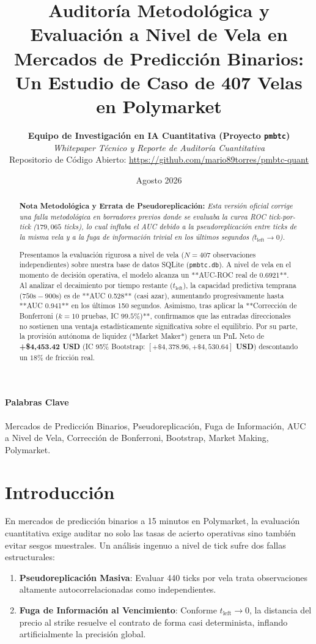 \documentclass[10pt,twocolumn]{article}
\title{\textbf{Auditoría Metodológica y Evaluación a Nivel de Vela en Mercados de Predicción Binarios: Un Estudio de Caso de 407 Velas en Polymarket}}
\author{\textbf{Equipo de Investigación en IA Cuantitativa (Proyecto \texttt{pmbtc})} \\
\textit{Whitepaper Técnico y Reporte de Auditoría Cuantitativa} \\
Repositorio de Código Abierto: \url{https://github.com/mario89torres/pmbtc-quant}}
\date{Agosto 2026}
\begin{document}
\maketitle

\begin{abstract}
\noindent \textbf{Nota Metodológica y Errata de Pseudoreplicación:} \textit{Esta versión oficial corrige una falla metodológica en borradores previos donde se evaluaba la curva ROC tick-por-tick ($179,065$ ticks), lo cual inflaba el AUC debido a la pseudoreplicación entre ticks de la misma vela y a la fuga de información trivial en los últimos segundos ($t_{\text{left}} \to 0$).}

Presentamos la evaluación rigurosa a nivel de vela ($N=407$ observaciones independientes) sobre nuestra base de datos SQLite (\texttt{pmbtc.db}). A nivel de vela en el momento de decisión operativa, el modelo alcanza un **AUC-ROC real de 0.6921**. Al analizar el decaimiento por tiempo restante ($t_{\text{left}}$), la capacidad predictiva temprana ($750\text{s}-900\text{s}$) es de **AUC 0.528** (casi azar), aumentando progresivamente hasta **AUC 0.941** en los últimos 150 segundos. Asimismo, tras aplicar la **Corrección de Bonferroni ($k=10$ pruebas, IC $99.5\%$)**, confirmamos que las entradas direccionales no sostienen una ventaja estadísticamente significativa sobre el equilibrio. Por su parte, la provisión autónoma de liquidez (*Market Maker*) genera un PnL Neto de \textbf{+\$4,453.42 USD} (IC 95\% Bootstrap: \textbf{$[+\$4,378.96, +\$4,530.64]$ USD}) descontando un $18\%$ de fricción real.
\end{abstract}

\paragraph{\textbf{Palabras Clave}} Mercados de Predicción Binarios, Pseudoreplicación, Fuga de Información, AUC a Nivel de Vela, Corrección de Bonferroni, Bootstrap, Market Making, Polymarket.

\section{Introducción}
En mercados de predicción binarios a 15 minutos en Polymarket, la evaluación cuantitativa exige auditar no solo las tasas de acierto operativas sino también evitar sesgos muestrales. Un análisis ingenuo a nivel de tick sufre dos fallas estructurales:
\begin{enumerate}
    \item \textbf{Pseudoreplicación Masiva}: Evaluar 440 ticks por vela trata observaciones altamente autocorrelacionadas como independientes.
    \item \textbf{Fuga de Información al Vencimiento}: Conforme $t_{\text{left}} \to 0$, la distancia del precio al strike resuelve el contrato de forma casi determinista, inflando artificialmente la precisión global.
\end{enumerate}
\end{document}
